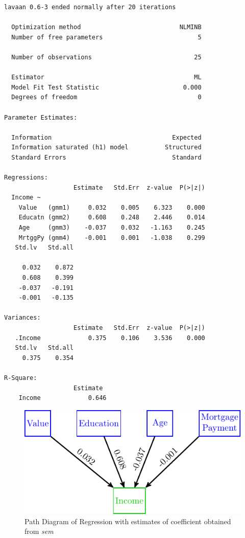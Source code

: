 \begin{verbatim}
lavaan 0.6-3 ended normally after 20 iterations

  Optimization method                           NLMINB
  Number of free parameters                          5

  Number of observations                            25

  Estimator                                         ML
  Model Fit Test Statistic                       0.000
  Degrees of freedom                                 0

Parameter Estimates:

  Information                                 Expected
  Information saturated (h1) model          Structured
  Standard Errors                             Standard

Regressions:
                   Estimate   Std.Err  z-value  P(>|z|)
  Income ~                                             
    Value   (gmm1)     0.032    0.005    6.323    0.000
    Educatn (gmm2)     0.608    0.248    2.446    0.014
    Age     (gmm3)    -0.037    0.032   -1.163    0.245
    MrtggPy (gmm4)    -0.001    0.001   -1.038    0.299
   Std.lv   Std.all
                   
     0.032    0.872
     0.608    0.399
    -0.037   -0.191
    -0.001   -0.135

Variances:
                   Estimate   Std.Err  z-value  P(>|z|)
   .Income             0.375    0.106    3.536    0.000
   Std.lv   Std.all
     0.375    0.354

R-Square:
                   Estimate 
    Income             0.646
\end{verbatim}

\begin{figure}[H]

{\centering \includegraphics[width=0.8\linewidth]{images/RegSEM1Values} 

}

\caption{Path Diagram of Regression with estimates of coefficient obtained from \emph{sem}}\label{fig:RegSEM1Values}
\end{figure}

